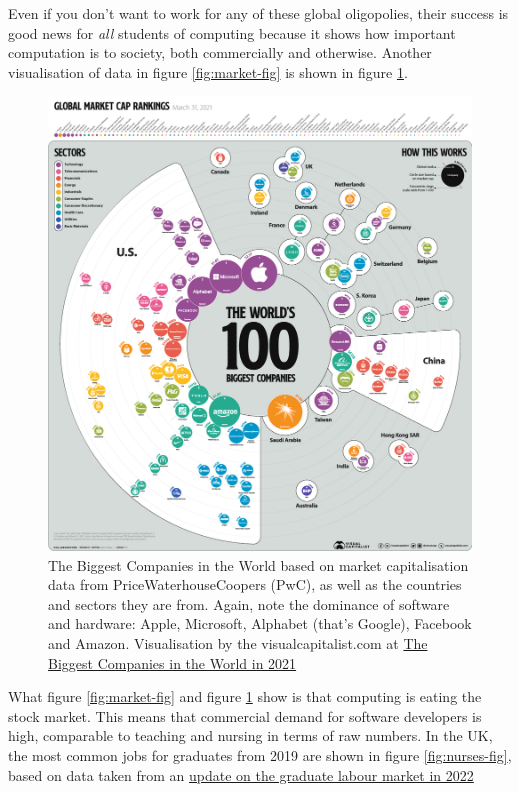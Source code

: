 \documentclass[
]{book}
\begin{document}
Even if you don't want to work for any of these global oligopolies, their success is good news for \emph{all} students of computing because it shows how important computation is to society, both commercially and otherwise. Another visualisation of data in figure \ref{fig:market-fig} is shown in figure \ref{fig:market-again-fig}.

\begin{figure}

{\centering \includegraphics[width=1\linewidth]{images/Biggest-Companies-in-the-World} 

}

\caption{The Biggest Companies in the World based on market capitalisation data from PriceWaterhouseCoopers (PwC), as well as the countries and sectors they are from. Again, note the dominance of software and hardware: Apple, Microsoft, Alphabet (that's Google), Facebook and Amazon. Visualisation by the visualcapitalist.com at \href{https://www.visualcapitalist.com/the-biggest-companies-in-the-world-in-2021/}{The Biggest Companies in the World in 2021} \citep{visualcap}}\label{fig:market-again-fig}
\end{figure}



What figure \ref{fig:market-fig} and figure \ref{fig:market-again-fig} show is that computing is eating the stock market. This means that commercial demand for software developers is high, comparable to teaching and nursing in terms of raw numbers. In the UK, the most common jobs for graduates from 2019 are shown in figure \ref{fig:nurses-fig}, based on data taken from an \href{https://luminate.prospects.ac.uk/uk-graduate-labour-market-update-11-january}{update on the graduate labour market in 2022} \citep{labourmarket2022}
\end{document}
